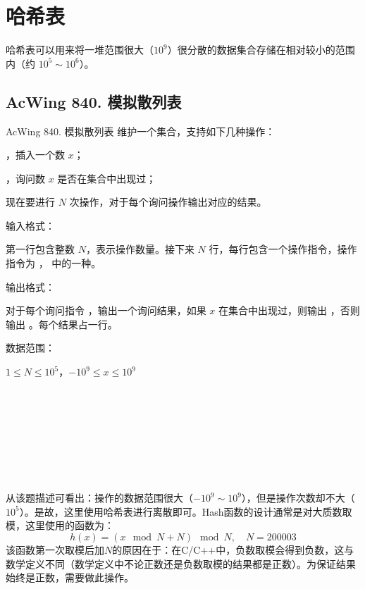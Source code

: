 \section{哈希表}
哈希表可以用来将一堆范围很大（$10^9$）很分散的数据集合存储在相对较小的范围内（约 $10^5 \sim 10^6$）。

\subsection{AcWing 840. 模拟散列表}

\begin{titledbox}{AcWing 840. 模拟散列表}
    维护一个集合，支持如下几种操作：

     ，插入一个数 $x$；

     ，询问数 $x$ 是否在集合中出现过；

    现在要进行 $N$ 次操作，对于每个询问操作输出对应的结果。

    输入格式：

    第一行包含整数 $N$，表示操作数量。接下来 $N$ 行，每行包含一个操作指令，操作指令为  ，  中的一种。

    输出格式：

    对于每个询问指令  ，输出一个询问结果，如果 $x$ 在集合中出现过，则输出  ，否则输出  。每个结果占一行。

    数据范围：

    $1 \le N \le 10^5$，$-10^9 \le x \le 10^9$

    \begin{inputblock}
         \\
         \\
         \\
         \\
         \\
    \end{inputblock}
    \begin{outputblock}
         \\
    \end{outputblock}
\end{titledbox}

从该题描述可看出：操作的数据范围很大（$-10^9 \sim 10^9$），但是操作次数却不大（$10^5$）。是故，这里使用哈希表进行离散即可。Hash函数的设计通常是对大质数取模，这里使用的函数为：
\begin{equation*}
    h(x) = (x \mod N + N) \mod N, \quad N = 200003
\end{equation*}
该函数第一次取模后加$N$的原因在于：在C/C++中，负数取模会得到负数，这与数学定义不同（数学定义中不论正数还是负数取模的结果都是正数）。为保证结果始终是正数，需要做此操作。

